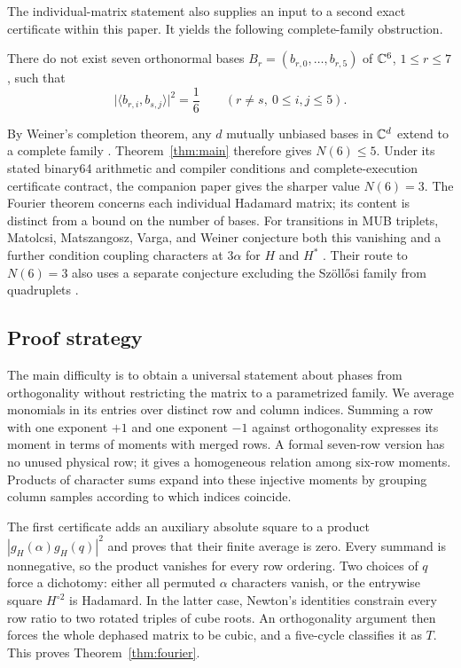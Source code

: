 \documentclass[11pt]{article}
\begin{document}
The individual-matrix statement also supplies an input to a second
exact certificate within this paper. It yields the following
complete-family obstruction.

\begin{theorem}\label{thm:main}
There do not exist seven orthonormal bases
$B_r=(b_{r,0},\ldots,b_{r,5})$ of $\mathbb C^6$, $1\le r\le7$, such that
\[
 \bigl|\langle b_{r,i},b_{s,j}\rangle\bigr|^2=\frac16
 \qquad(r\ne s,\ 0\le i,j\le5).
\]
\end{theorem}

By Weiner's completion theorem, any $d$ mutually unbiased bases in $\mathbb C^d$
extend to a complete family \cite[Corollary~3.4]{Weiner2013}.
Theorem~\ref{thm:main} therefore gives $N(6)\le5$.
Under its stated binary64 arithmetic and compiler conditions and complete-execution
certificate contract, the companion paper
\cite[Theorem~1.1, Section~7 and Appendix~A]{OpenAI2026MUBMaximum}
gives the sharper value $N(6)=3$.
The Fourier theorem concerns each individual Hadamard matrix; its content
is distinct from a bound on the number of bases. For transitions in MUB
triplets, Matolcsi, Matszangosz, Varga, and Weiner conjecture both this
vanishing and a further condition coupling characters at $3\alpha$ for
$H$ and $H^*$ \cite[Conjecture~2]{MatolcsiEtAl2025}. Their route to
$N(6)=3$ also uses a separate conjecture excluding the Sz\"oll\H{o}si
family from quadruplets \cite[Conjecture~3 and Proposition~4.2]{MatolcsiEtAl2025}.

\subsection{Proof strategy}

The main difficulty is to obtain a universal statement about phases from
orthogonality without restricting the matrix to a parametrized family.
We average monomials in its entries over distinct row and column indices.
Summing a row with one exponent $+1$ and one exponent $-1$ against
orthogonality expresses its moment in terms of moments with merged rows. A formal seven-row version
has no unused physical row; it gives a homogeneous relation among
six-row moments. Products of character sums expand into these injective
moments by grouping column samples according to which indices coincide.

The first certificate adds an auxiliary absolute square to a product
$|g_H(\alpha)g_H(q)|^2$ and proves that their finite average is zero.
Every summand is nonnegative, so the product vanishes for every row
ordering. Two choices of $q$ force a dichotomy: either all permuted
$\alpha$ characters vanish, or the entrywise square $H^{\circ2}$ is
Hadamard. In the latter case, Newton's identities constrain every row
ratio to two rotated triples of cube roots. An orthogonality argument
then forces the whole dephased matrix to be cubic, and a five-cycle
classifies it as $T$. This proves Theorem~\ref{thm:fourier}.
\end{document}
